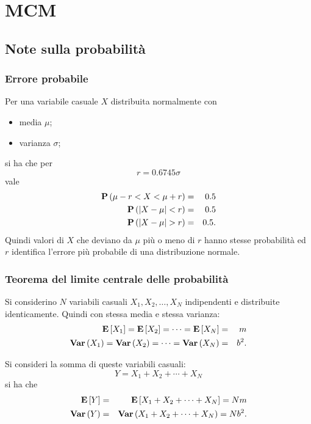 \chapter{\acf{MCM}}
\section{Note sulla probabilit\`a}
\subsection{Errore probabile}
Per una variabile casuale $X$ distribuita normalmente con
\begin{itemize}
\item media $\mu$;
\item varianza $\sigma$;
\end{itemize}
si ha che per
\begin{equation*}
  r = 0.6745\sigma
\end{equation*}
vale
\begin{eqnarray*}
  \prob{\mu-r<X<\mu+r} &=& 0.5\\
  \prob{\abs{X-\mu}<r} &=& 0.5\\
  \prob{\abs{X-\mu}>r} &=& 0.5.
\end{eqnarray*}
Quindi valori di $X$ che deviano da $\mu$ pi\`u o meno di $r$ hanno
stesse probabilit\`a ed $r$ identifica l'errore pi\`u probabile di
una distribuzione normale.

\subsection{Teorema del limite centrale delle probabilit\`a}
Si considerino $N$ variabili casuali $X_1,X_2,\dots,X_N$ indipendenti e distribuite
identicamente. Quindi con stessa media e stessa varianza:
\begin{eqnarray*}
  \mathrm{\textbf{E}}\left[X_1\right]=\mathrm{\textbf{E}}\left[X_2\right]=\dots=\mathrm{\textbf{E}}\left[X_N\right]&=&m\\
  \mathrm{\textbf{Var}}\left(X_1\right)=\mathrm{\textbf{Var}}\left(X_2\right)=\dots=\mathrm{\textbf{Var}}\left(X_N\right)&=&b^2.
\end{eqnarray*}

Si consideri la somma di queste variabili casuali:
\begin{equation*}
  Y = X_1+X_2+\cdots+X_N
\end{equation*}
si ha che
\begin{eqnarray*}
  \mathrm{\textbf{E}}\left[Y\right]&=&\mathrm{\textbf{E}}\left[X_1+X_2+\cdots+X_N\right]=Nm\\
  \mathrm{\textbf{Var}}\left(Y\right)&=&\mathrm{\textbf{Var}}\left(X_1+X_2+\cdots+X_N\right)=Nb^2.
\end{eqnarray*}

